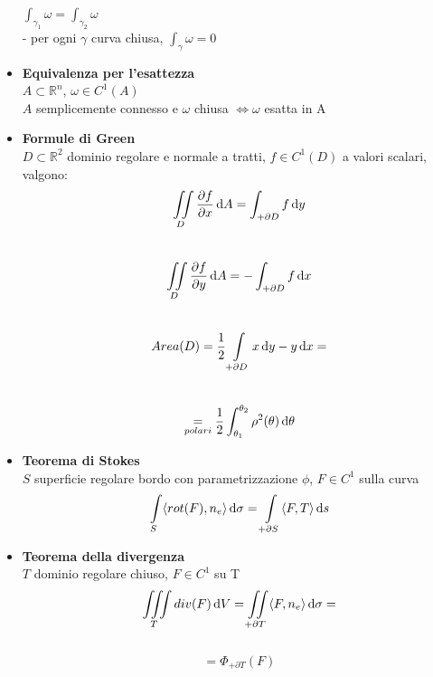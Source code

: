 \documentclass[a4paper,portrait,columns=3,5pt]{cheatsheet}
\begin{document}
\begin{itemize}
					$\int_{\gamma_1} \omega = \int_{\gamma_2}\omega$\\
				- per ogni $\gamma$ curva chiusa, $\int_\gamma \omega = 0$
	\item \textbf{Equivalenza per l'esattezza}\\
			$A\subset \mathbb{R}^n$, $\omega \in C^1(A)$\\ $A$ semplicemente connesso e $\omega$ chiusa $\Leftrightarrow \omega$ esatta in A
	\item \textbf{Formule di Green}\\
			$D \subset \mathbb{R}^2$ dominio regolare e normale a tratti, $f \in C^1(D)$ a valori scalari, valgono:\\
			 $$\iint\limits_D\dfrac{\partial f}{\partial x} \dif A = \int_{+\partial D} f \dif y$$\\
			$$\iint\limits_D \dfrac{\partial f}{\partial y} \dif A = -\int_{+\partial D} f \dif x$$\\
			$$ Area(D) = \frac{1}{2} \int\limits_{+\partial D} x\dif y - y\dif x = $$ \\
			 $$ \underset{polari}{=} \frac{1}{2}\int_{\theta_1}^{\theta_2} \rho^2(\theta) \dif \theta$$
	\item \textbf{Teorema di Stokes}\\ 
			$S$ superficie regolare bordo con parametrizzazione $\phi$, $F \in C^1$ sulla curva 
			$$ \int\limits_S \langle rot(F), n_e \rangle \dif \sigma = \int\limits_{+\partial S}\langle F, T \rangle \dif s$$ 
	\item \textbf{Teorema della divergenza}\\
			$T$ dominio regolare chiuso, $F \in C^1$ su T
			$$ \iiint\limits_T div(F) \dif V = \iint\limits_{+\partial T} \langle F, n_e \rangle \dif \sigma =$$ \\
			$$ = \Phi_{+\partial T}(F)$$
\end{itemize}
\end{document}
